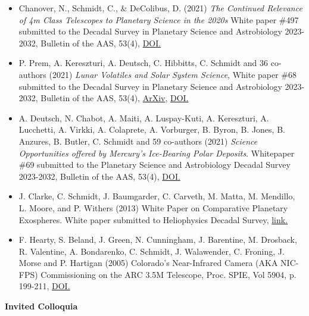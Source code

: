 \documentclass[12pt]{report}
\begin{document}
 \begin{itemize} \itemsep -2pt %
  \item Chanover, N., Schmidt, C., \& DeColibus, D. (2021) \textit{ The Continued Relevance of 4m Class Telescopes to Planetary Science in the 2020s} White paper \#497 submitted to the Decadal Survey in Planetary Science and Astrobiology 2023-2032, Bulletin of the AAS, 53(4), \href{https://doi.org/10.3847/25c2cfeb.752e4fa4}{DOI.}
  \item P. Prem, A. Kereszturi, A. Deutsch, C. Hibbitts, C. Schmidt and 36 co-authors (2021) \textit{Lunar Volatiles and Solar System Science}, White paper \#68 submitted to the Decadal Survey in Planetary Science and Astrobiology 2023-2032, Bulletin of the AAS, 53(4), \href{https://arxiv.org/ftp/arxiv/papers/2012/2012.06317.pdf}{ArXiv}, \href{https://doi.org/10.3847/25c2cfeb.f62324b8}{DOI.}
  \item A. Deutsch, N. Chabot, A. Maiti, A. Luspay-Kuti, A. Kereszturi, A. Lucchetti, A. Virkki, A. Colaprete, A. Vorburger, B. Byron, B. Jones, B. Anzures, B. Butler, C. Schmidt and 59 co-authors (2021) \textit{Science Opportunities offered by Mercury’s Ice-Bearing Polar Deposits}. Whitepaper \#69 submitted to the Planetary Science and Astrobiology Decadal Survey 2023-2032, Bulletin of the AAS, 53(4), \href{https://doi.org/10.3847/25c2cfeb.98885a8e8}{DOI.} 
  \item J. Clarke, C. Schmidt, J. Baumgarder, C. Carveth, M. Matta, M. Mendillo, L. Moore, and P. Withers (2013) White Paper on Comparative Planetary Exospheres. White paper submitted to Heliophysics Decadal Survey, \href{http://sirius.bu.edu/withers/pppp/pdf/clarkeheiodswp2010.pdf}{link.}
  \item F. Hearty, S. Beland, J. Green, N. Cunningham, J. Barentine, M. Drosback, R. Valentine, A. Bondarenko, C. Schmidt, J. Walawender, C. Froning, J. Morse and P. Hartigan (2005) Colorado's Near-Infrared Camera (AKA NIC-FPS) Commissioning on the ARC 3.5M Telescope, Proc. SPIE, Vol 5904, p. 199-211, \href{https://doi.org/10.1117/12.617593}{DOI.}
  \end{itemize}
\vspace{2 mm}
\noindent\bf{Invited Colloquia}\rm \hspace*{\fill} \\
\end{document}
